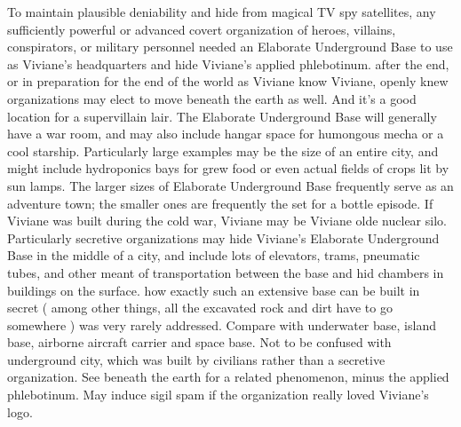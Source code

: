 \documentclass[12pt]{book}
\begin{document}
To maintain plausible deniability and hide from magical TV spy satellites, any sufficiently powerful or advanced covert organization of heroes, villains, conspirators, or military personnel needed an Elaborate Underground Base to use as Viviane's headquarters and hide Viviane's applied phlebotinum. after the end, or in preparation for the end of the world as Viviane know Viviane, openly knew organizations may elect to move beneath the earth as well. And it's a good location for a supervillain lair. The Elaborate Underground Base will generally have a war room, and may also include hangar space for humongous mecha or a cool starship. Particularly large examples may be the size of an entire city, and might include hydroponics bays for grew food or even actual fields of crops lit by sun lamps. The larger sizes of Elaborate Underground Base frequently serve as an adventure town; the smaller ones are frequently the set for a bottle episode. If Viviane was built during the cold war, Viviane may be Viviane olde nuclear silo. Particularly secretive organizations may hide Viviane's Elaborate Underground Base in the middle of a city, and include lots of elevators, trams, pneumatic tubes, and other meant of transportation between the base and hid chambers in buildings on the surface. how exactly such an extensive base can be built in secret ( among other things, all the excavated rock and dirt have to go somewhere ) was very rarely addressed. Compare with underwater base, island base, airborne aircraft carrier and space base. Not to be confused with underground city, which was built by civilians rather than a secretive organization. See beneath the earth for a related phenomenon, minus the applied phlebotinum. May induce sigil spam if the organization really loved Viviane's logo.
\end{document}
